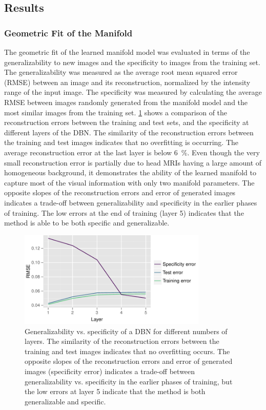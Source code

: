 \subsection{Results}

\subsubsection{Geometric Fit of the Manifold}

The geometric fit of the learned manifold model was evaluated in terms of the
generalizability to new images and the specificity to images from the training
set. The generalizability was measured as the average root mean squared error
(RMSE) between an image and its reconstruction, normalized by the intensity
range of the input image. The specificity was measured by calculating the
average RMSE between images randomly generated from the manifold model and the
most similar images from the training set. \ref{fig:genspe} shows a
comparison of the reconstruction errors between the training and test sets, and
the specificity at different layers of the DBN. The similarity of the
reconstruction errors between the training and test images indicates that no
overfitting is occurring. The average reconstruction error at the last layer is
below \SI{6}{\percent}. Even though the very small reconstruction error is
partially due to head MRIs having a large amount of homogeneous background, it
demonstrates the ability of the learned manifold to capture most of the visual
information with only two manifold parameters. The opposite slopes of the
reconstruction errors and error of generated images indicates a trade-off
between generalizability and specificity in the earlier phases of training. The
low errors at the end of training (layer 5) indicates that the method is able to
be both specific and generalizable.

\begin{figure}[tb]
\centering
%
\includegraphics[width=0.8\textwidth]{figures/genspe}

\caption[Generalizability vs. specificity of a DBN for different numbers of
layers]{Generalizability vs. specificity of a DBN for different numbers of
layers. The similarity of the reconstruction errors between the training and
test images indicates that no overfitting occurs. The opposite slopes of the reconstruction errors and error of generated images (specificity error)
indicates a trade-off between generalizability vs. specificity in the earlier
phases of training, but the low errors at layer 5 indicate that the method is
both generalizable and specific.}
\label{fig:genspe}
\end{figure}

